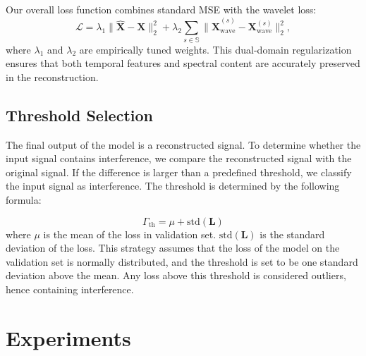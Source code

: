 \documentclass[conference]{IEEEtran}
\begin{document}
Our overall loss function combines standard MSE with the wavelet loss:
\begin{equation}
    \mathcal{L} = \lambda_1\|\mathbf{\hat{X}} - \mathbf{X}\|_2^2 + \lambda_2\sum_{s\in\mathbb{S}} \|\mathbf{\hat{X}}_{\text{wave}}^{(s)} - \mathbf{X}_{\text{wave}}^{(s)}\|_2^2,
\end{equation}
where $\lambda_1$ and $\lambda_2$ are empirically tuned weights. This dual-domain regularization ensures that both temporal features and spectral content are accurately preserved in the reconstruction.


\subsection{Threshold Selection}

The final output of the model is a reconstructed signal. To determine whether the input signal contains interference, we compare the reconstructed signal with the original signal. If the difference is larger than a predefined threshold, we classify the input signal as interference. The threshold is determined by the following formula:

\begin{equation}
    \Gamma_{\text{th}} = \mu + \text{std}(\mathbf{L})
\end{equation}
where $\mu$ is the mean of the loss in validation set.  $\text{std}(\mathbf{L})$ is the standard deviation of the loss. This strategy assumes that the loss of the model on the validation set is normally distributed, and the threshold is set to be one standard deviation above the mean. Any loss above this threshold is considered outliers, hence containing interference.



\section{Experiments}
\label{sec:experiments}


\end{document}
